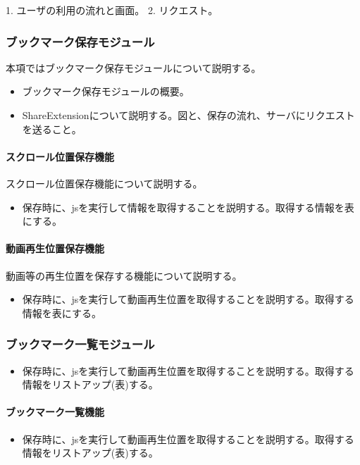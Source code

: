 1. ユーザの利用の流れと画面。
2. リクエスト。

\subsubsection{ブックマーク保存モジュール}
本項ではブックマーク保存モジュールについて説明する。
\begin{itemize}
  \item ブックマーク保存モジュールの概要。
  \item ShareExtensionについて説明する。図と、保存の流れ、サーバにリクエストを送ること。
\end{itemize}

\paragraph{スクロール位置保存機能}
スクロール位置保存機能について説明する。
\begin{itemize}
  \item 保存時に、jsを実行して情報を取得することを説明する。取得する情報を表にする。
\end{itemize}

\paragraph{動画再生位置保存機能}
動画等の再生位置を保存する機能について説明する。
\begin{itemize}
  \item 保存時に、jsを実行して動画再生位置を取得することを説明する。取得する情報を表にする。
\end{itemize}

\subsubsection{ブックマーク一覧モジュール}
\begin{itemize}
  \item 保存時に、jsを実行して動画再生位置を取得することを説明する。取得する情報をリストアップ(表)する。
\end{itemize}

\paragraph{ブックマーク一覧機能}
\begin{itemize}
  \item 保存時に、jsを実行して動画再生位置を取得することを説明する。取得する情報をリストアップ(表)する。
\end{itemize}

